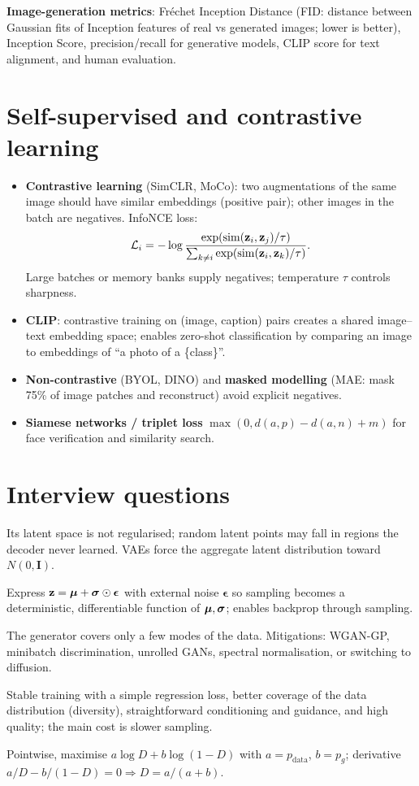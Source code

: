 \textbf{Image-generation metrics}: Fréchet Inception Distance (FID: distance between Gaussian fits of Inception features of real vs generated images; lower is better), Inception Score, precision/recall for generative models, CLIP score for text alignment, and human evaluation.

\section{Self-supervised and contrastive learning}
\begin{itemize}
  \item \textbf{Contrastive learning} (SimCLR, MoCo): two augmentations of the same image should have similar embeddings (positive pair); other images in the batch are negatives. InfoNCE loss:
  \[\mathcal{L}_i=-\log\frac{\exp(\operatorname{sim}(\mathbf{z}_i,\mathbf{z}_j)/\tau)}{\sum_{k\ne i}\exp(\operatorname{sim}(\mathbf{z}_i,\mathbf{z}_k)/\tau)}.\]
  Large batches or memory banks supply negatives; temperature $\tau$ controls sharpness.
  \item \textbf{CLIP}: contrastive training on (image, caption) pairs creates a shared image--text embedding space; enables zero-shot classification by comparing an image to embeddings of ``a photo of a \{class\}''.
  \item \textbf{Non-contrastive} (BYOL, DINO) and \textbf{masked modelling} (MAE: mask 75\% of image patches and reconstruct) avoid explicit negatives.
  \item \textbf{Siamese networks / triplet loss} $\max(0,d(a,p)-d(a,n)+m)$ for face verification and similarity search.
\end{itemize}

\section{Interview questions}
\A Its latent space is not regularised; random latent points may fall in regions the decoder never learned. VAEs force the aggregate latent distribution toward $N(0,\mathbf{I})$.

\A Express $\mathbf{z}=\bm{\mu}+\bm\sigma\odot\bm\epsilon$ with external noise $\bm\epsilon$ so sampling becomes a deterministic, differentiable function of $\bm{\mu},\bm\sigma$; enables backprop through sampling.

\A The generator covers only a few modes of the data. Mitigations: WGAN-GP, minibatch discrimination, unrolled GANs, spectral normalisation, or switching to diffusion.

\A Stable training with a simple regression loss, better coverage of the data distribution (diversity), straightforward conditioning and guidance, and high quality; the main cost is slower sampling.

\A Pointwise, maximise $a\log D+b\log(1-D)$ with $a=p_{\text{data}}$, $b=p_g$; derivative $a/D-b/(1-D)=0\Rightarrow D=a/(a+b)$.
